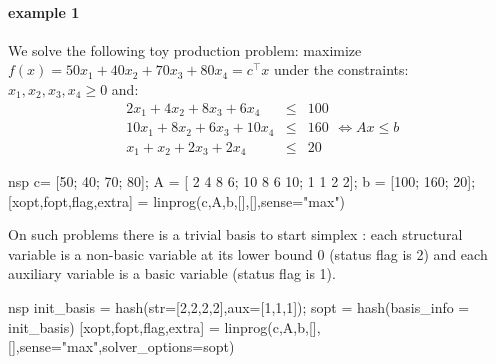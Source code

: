 \begin{examples}
\paragraph{example 1} We solve the following toy production problem: maximize
$f(x) = 50 x_1 + 40 x_2 + 70 x_3 + 80 x_4 = c^{\top} x$ under the constraints:
$x_1, x_2, x_3, x_4 \ge  0$ and:
$$
\begin{array}{rcl}
   2 x_1 + 4 x_2 +  8 x_3 +  6 x_4 & \le & 100\\
   10 x_1 + 8 x_2 + 6 x_3 + 10 x_4 & \le & 160\\
      x_1 +  x_2  + 2 x_3 +  2 x_4 & \le & 20
\end{array} \iff  A x \le b
$$
\begin{mintednsp}{nsp}
c= [50; 40; 70; 80];
A = [ 2 4 8  6;
     10 8 6 10;
      1 1 2  2];
b = [100; 160;  20];
[xopt,fopt,flag,extra] = linprog(c,A,b,[],[],sense="max")
\end{mintednsp}
On such problems there is a trivial basis to start simplex : each structural variable
is a non-basic variable at its lower bound 0 (status flag is 2) and each auxiliary variable 
is a basic variable (status flag is 1). 
\begin{mintednsp}{nsp}
init_basis = hash(str=[2,2,2,2],aux=[1,1,1]);
sopt = hash(basis_info = init_basis)
[xopt,fopt,flag,extra] = linprog(c,A,b,[],[],sense="max",solver_options=sopt)
\end{mintednsp}


\end{examples}
